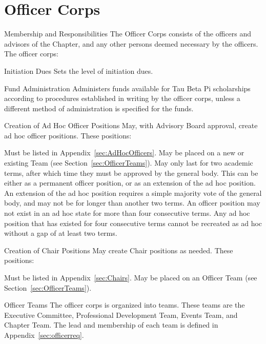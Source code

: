 \section{Officer Corps}\label{sec:officercorps} 
\begin{enumsubsection}
\item{Membership and Responsibilities} The Officer Corps consists of the officers and advisors of the Chapter, and any other persons deemed necessary by the officers. The officer corps:
\begin{enumsubsubsection}
\item*{Initiation Dues} Sets the level of initiation dues.
\item*{Fund Administration} Administers funds available for Tau Beta Pi scholarships according to procedures established in writing by the officer corps, unless a different method of administration is specified for the funds.
\item*{Creation of Ad Hoc Officer Positions}\label{sec:AdHocCreation} May, with Advisory Board approval, create ad hoc officer positions. These positions:
\begin{enumerate}
	\itemnotoc Must be listed in Appendix~\ref{sec:AdHocOfficers}.
	\itemnotoc May be placed on a new or existing Team (see Section~\ref{sec:OfficerTeams}).
	\itemnotoc May only last for two academic terms, after which time they must be approved by the general body. This can be either as a permanent officer position, or as an extension of the ad hoc position. An extension of the ad hoc position requires a simple majority vote of the general body, and may not be for longer than another two terms. An officer position may not exist in an ad hoc state for more than four consecutive terms. Any ad hoc position that has existed for four consecutive terms cannot be recreated as ad hoc without a gap of at least two terms.
\end{enumerate}
\item*{Creation of Chair Positions}\label{sec:ChairCreation} May create Chair positions as needed. These positions:
\begin{enumerate}
	\itemnotoc Must be listed in Appendix~\ref{sec:Chairs}.
	\itemnotoc May be placed on an Officer Team (see Section~\ref{sec:OfficerTeams}).
\end{enumerate}
 \end{enumsubsubsection}
\item{Officer Teams}\label{sec:OfficerTeams} The officer corps is organized into teams. These teams are the Executive Committee, Professional Development Team, Events Team, and Chapter Team. The lead and membership of each team is defined in Appendix~\ref{sec:officerreq}.

\end{enumsubsection}
